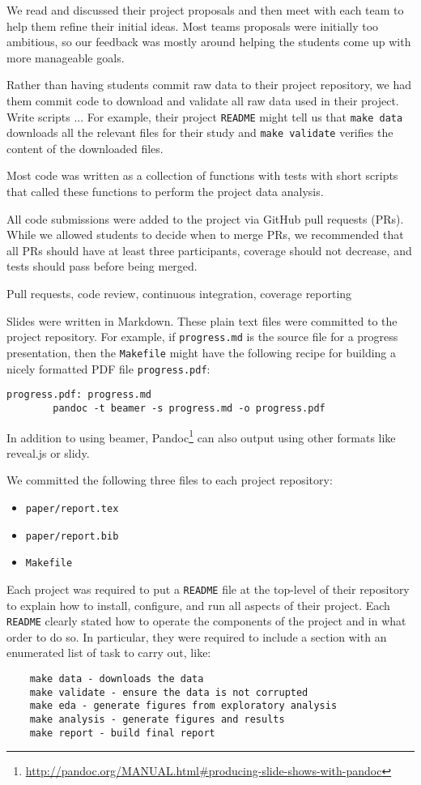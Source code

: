 We read and discussed their project proposals and then meet with each
team to help them refine their initial ideas.
Most teams proposals were initially too ambitious, so our feedback
was mostly around helping the students come up with more manageable
goals.
 
Rather than having students commit raw data to their project repository, we had
them commit code to download and validate all raw data used in their project.
Write scripts ...
For example, their project \texttt{README} might tell us that \texttt{make data}
downloads all the relevant files for their study and \texttt{make validate}
verifies the content of the downloaded files.

Most code was written as a collection of functions with tests with short
scripts that called these functions to perform the project data analysis.

All code submissions were added to the project via GitHub pull requests (PRs).
While we allowed students to decide when to merge PRs, we recommended that
all PRs should have at least three participants, coverage should not decrease,
and tests should pass before being merged.

Pull requests, code review, continuous integration, coverage reporting

Slides were written in Markdown.
These plain text files were committed to the project repository.
For example, if \texttt{progress.md} is the source file for a progress presentation,
then the \texttt{Makefile} might have the following recipe for building a nicely
formatted PDF file \texttt{progress.pdf}:
\begin{verbatim}
progress.pdf: progress.md
        pandoc -t beamer -s progress.md -o progress.pdf
\end{verbatim}

In addition to using beamer,
Pandoc\footnote{\url{http://pandoc.org/MANUAL.html\#producing-slide-shows-with-pandoc}}
can also output using other formats like reveal.js or slidy.

We committed the following three files to each project repository:
\begin{itemize}
\item \texttt{paper/report.tex}
\item \texttt{paper/report.bib}
\item \texttt{Makefile}
\end{itemize}


Each project was required to put a \texttt{README} file at the top-level
of their repository to explain how to install, configure,
and run all aspects of their project.
Each \texttt{README} clearly stated  how to operate the
components of the project and in what order to do so.
In particular, they were required to include a section with
an enumerated list of task to carry out, like:
\begin{verbatim}
    make data - downloads the data 
    make validate - ensure the data is not corrupted
    make eda - generate figures from exploratory analysis
    make analysis - generate figures and results
    make report - build final report
\end{verbatim}

